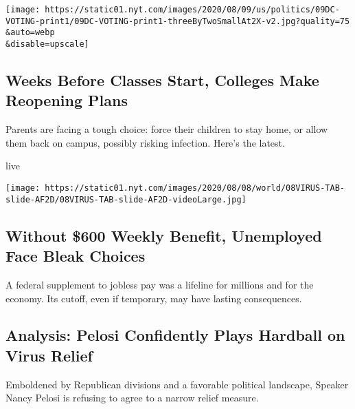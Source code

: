 \href{/2020/08/08/us/politics/voting-nov-3-election.html}{}

\texttt{[image: https://static01.nyt.com/images/2020/08/09/us/politics/09DC-VOTING-print1/09DC-VOTING-print1-threeByTwoSmallAt2X-v2.jpg?quality=75\\\&auto=webp\\\&disable=upscale]}

\href{/2020/08/08/world/coronavirus-updates.html}{}

\hypertarget{weeks-before-classes-start-colleges-make-reopening-plans}{%
\subsection{Weeks Before Classes Start, Colleges Make Reopening
Plans}\label{weeks-before-classes-start-colleges-make-reopening-plans}}

Parents are facing a tough choice: force their children to stay home, or
allow them back on campus, possibly risking infection. Here's the
latest.

live

\texttt{[image: https://static01.nyt.com/images/2020/08/08/world/08VIRUS-TAB-slide-AF2D/08VIRUS-TAB-slide-AF2D-videoLarge.jpg]}

\href{/2020/08/08/business/economy/lost-unemployment-benefits.html}{}

\hypertarget{without-600-weekly-benefit-unemployed-face-bleak-choices}{%
\subsection{Without \$600 Weekly Benefit, Unemployed Face Bleak
Choices}\label{without-600-weekly-benefit-unemployed-face-bleak-choices}}

A federal supplement to jobless pay was a lifeline for millions and for
the economy. Its cutoff, even if temporary, may have lasting
consequences.

\href{/2020/08/08/us/politics/nancy-pelosi-coronavirus-relief.html}{}

\hypertarget{analysis-pelosi-confidently-plays-hardball-on-virus-relief}{%
\subsection{Analysis: Pelosi Confidently Plays Hardball on Virus
Relief}\label{analysis-pelosi-confidently-plays-hardball-on-virus-relief}}

Emboldened by Republican divisions and a favorable political landscape,
Speaker Nancy Pelosi is refusing to agree to a narrow relief measure.

